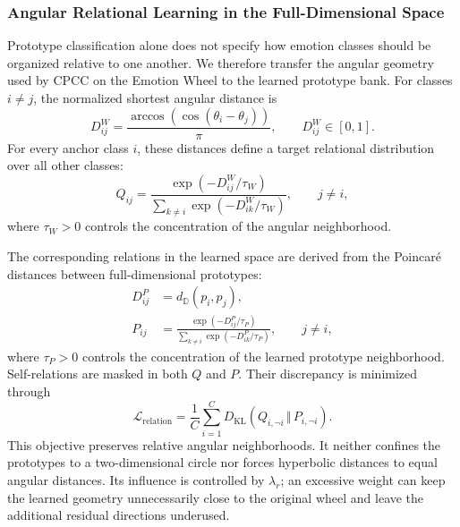 \documentclass[letterpaper,journal]{IEEEtran}
\begin{document}
\subsubsection{Angular Relational Learning in the Full-Dimensional Space}

Prototype classification alone does not specify how emotion classes should be
organized relative to one another. We therefore transfer the angular geometry
used by CPCC on the Emotion Wheel to the learned prototype bank.
For classes \(i\neq j\), the normalized shortest angular distance is
\begin{equation}
    D_{ij}^{W}
    =\frac{\arccos\!\left(\cos(\theta_i-\theta_j)\right)}{\pi},
    \qquad D_{ij}^{W}\in[0,1].
    \label{eq:rgrpl_wheel_distance}
\end{equation}
For every anchor class \(i\), these distances define a target relational
distribution over all other classes:
\begin{equation}
    Q_{ij}
    =\frac{\exp(-D_{ij}^{W}/\tau_W)}
    {\sum_{k\neq i}\exp(-D_{ik}^{W}/\tau_W)},
    \qquad j\neq i,
    \label{eq:rgrpl_wheel_neighbors}
\end{equation}
where \(\tau_W>0\) controls the concentration of the angular neighborhood.

The corresponding relations in the learned space are derived from the
Poincar\'e distances between full-dimensional prototypes:
\begin{align}
    D_{ij}^{P}
    &=d_{\mathbb{D}}(p_i,p_j),
    \label{eq:rgrpl_prototype_distance}\\
    P_{ij}
    &=\frac{\exp(-D_{ij}^{P}/\tau_P)}
    {\sum_{k\neq i}\exp(-D_{ik}^{P}/\tau_P)},
    \qquad j\neq i,
    \label{eq:rgrpl_prototype_neighbors}
\end{align}
where \(\tau_P>0\) controls the concentration of the learned prototype
neighborhood. Self-relations are masked in both \(Q\) and \(P\). Their
discrepancy is minimized through
\begin{equation}
    \boxed{
    \mathcal{L}_{\mathrm{relation}}
    =\frac{1}{C}\sum_{i=1}^{C}
    D_{\mathrm{KL}}\!\left(
    Q_{i,\neg i}\,\Vert\,P_{i,\neg i}\right)}.
    \label{eq:rgrpl_relation_loss}
\end{equation}
This objective preserves relative angular neighborhoods. It neither confines
the prototypes to a two-dimensional circle nor forces hyperbolic distances to
equal angular distances. Its influence is controlled by \(\lambda_r\); an
excessive weight can keep the learned geometry unnecessarily close to the
original wheel and leave the additional residual directions underused.
\end{document}
